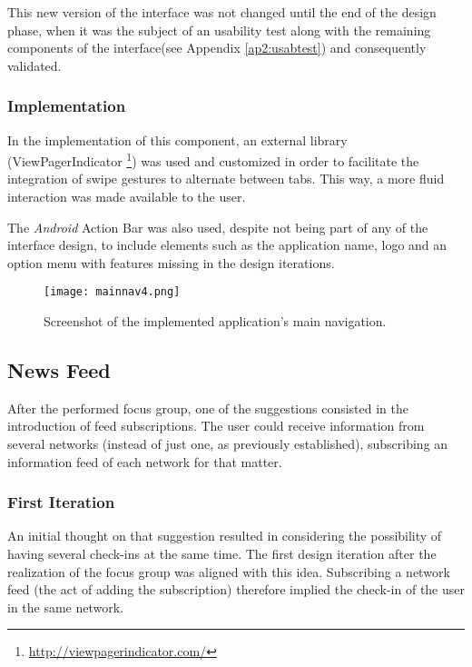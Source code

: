 This new version of the interface was not changed until the end of the design phase, when it was the subject of an usability test along with the remaining components of the interface(see Appendix \ref{ap2:usabtest}) and consequently validated.

\subsubsection{Implementation}

In the implementation of this component, an external library (ViewPagerIndicator \footnote{\url{http://viewpagerindicator.com/}}) was used and customized in order to facilitate the integration of swipe gestures to alternate between tabs. This way, a more fluid interaction was made available to the user.

The \emph{Android} Action Bar was also used, despite not being part of any of the interface design, to include elements such as the application name, logo and an option menu with features missing in the design iterations.

\begin{figure}[h!]
  \begin{center}
    \leavevmode
    \texttt{[image: mainnav4.png]}
    \caption{Screenshot of the implemented application's main navigation.}
    \label{fig:mainnav4}
  \end{center}
\end{figure}

\subsection{News Feed}\label{newsfeed}

After the performed focus group, one of the suggestions consisted in the introduction of feed subscriptions. The user could receive information from several networks (instead of just one, as previously established), subscribing an information feed of each network for that matter. 

\subsubsection{First Iteration}

An initial thought on that suggestion resulted in considering the possibility of having several check-ins at the same time. The first design iteration after the realization of the focus group was aligned with this idea. Subscribing a network feed (the act of adding the subscription) therefore implied the check-in of the user in the same network. 

